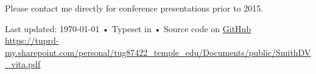 \documentclass[11pt, letterpaper]{article}
\begin{document}
\vspace{.5cm}
Please contact me directly for conference presentations prior to 2015. 




\vfill{}

\begin{center}
{\scriptsize  Last updated: \today\- •\-
Typeset in \href{http://nitens.org/taraborelli/cvtex}{\XeTeX} •\- Source code on \href{https://github.com/DVSneuro/my-cv}{GitHub}\\
\href{https://tuprd-my.sharepoint.com/:b:/g/personal/tug87422\_temple\_edu/EUsBksiKNP1KouiGJGznL9MBvl-KtIcUtjIBTYInycDV3Q}{https://tuprd-my.sharepoint.com/personal/tug87422\_temple\_edu/Documents/public/SmithDV\_vita.pdf}}
\end{center}
\end{document}
